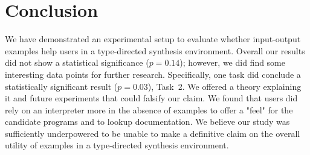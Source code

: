 \section{Conclusion}

We have demonstrated an experimental setup to evaluate whether input-output
examples help users in a type-directed synthesis environment.
%
Overall our results did not show a statistical significance ($p = 0.14$);
however, we did find some interesting data points for further research.
%
Specifically, one task did conclude a statistically significant result ($p =
0.03$), Task~2.
%
We offered a theory explaining it and future experiments that could falsify our
claim.
%
We found that users did rely on an interpreter more in the absence of examples
to offer a "feel" for the candidate programs and to lookup documentation.
%
We believe our study was sufficiently underpowered to be unable to make a
definitive claim on the overall utility of examples in a type-directed synthesis
environment.